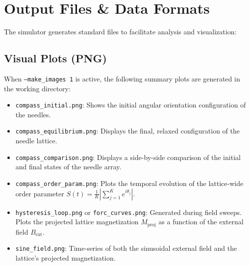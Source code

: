 \documentclass[11pt,a4paper]{article}
\newcommand{\code}[1]{\texttt{#1}}
\begin{document}
\section{Output Files \& Data Formats}
\label{sec:outputs}

The simulator generates standard files to facilitate analysis and visualization:

\subsection{Visual Plots (PNG)}
When \code{--make\_images 1} is active, the following summary plots are generated in the working directory:
\begin{itemize}
    \item \code{compass\_initial.png}: Shows the initial angular orientation configuration of the needles.
    \item \code{compass\_equilibrium.png}: Displays the final, relaxed configuration of the needle lattice.
    \item \code{compass\_comparison.png}: Displays a side-by-side comparison of the initial and final states of the needle array.
    \item \code{compass\_order\_param.png}: Plots the temporal evolution of the lattice-wide order parameter $S(t) = \frac{1}{K} \left| \sum_{j=1}^{K} e^{i\theta_j} \right|$.
    \item \code{hysteresis\_loop.png} or \code{forc\_curves.png}: Generated during field sweeps. Plots the projected lattice magnetization $M_{\text{proj}}$ as a function of the external field $B_{\text{ext}}$.
    \item \code{sine\_field.png}: Time-series of both the sinusoidal external field and the lattice's projected magnetization.
\end{itemize}
\end{document}
